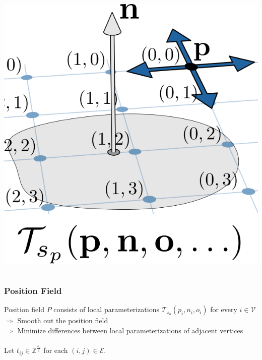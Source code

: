 \documentclass[aspectratio=43,sanserif,professionalfonts]{beamer}
\begin{document}
\begin{frame}
\begin{columns}
\begin{column}{0.2\textwidth}
			\includegraphics[width=\textwidth]{img/integer-translation.png}
		\end{column}
	\end{columns}
\end{frame}

\begin{frame}
	\frametitle{Position Field}
	Position field $P$ consists of local parameterizations $\mathcal{T}_{s_o}(p_i,n_i,o_i)$ for every $i \in \mathcal{V}$\\
	$\Rightarrow$ Smooth out the position field\\
	$\Rightarrow$ Minimize differences between local parameterizations of adjacent vertices\\
	\pause
	~\\
	Let $t_{ij} \in \mathbb{Z}^{\frac{s_o}{2}}$ for each $(i,j) \in \mathcal{E}$.\\
\end{frame}
\end{document}
